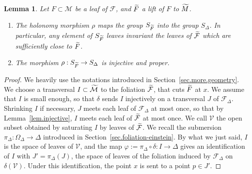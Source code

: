 \documentclass[11pt]{article}
\newtheorem{lemm}[theo]{Lemma}
\theoremstyle{definition}
\numberwithin{equation}{section}
\numberwithin{figure}{section}
\numberwithin{table}{section}
\newcommand{\calf}{\mathcal{F}}
\newcommand{\calm}{\mathcal{M}}
\newcommand{\tcalm}{\tilde{\mathcal{M}}}
\newcommand{\tm}{\tilde{{M}}}
\newcommand{\tcalf}{\tilde{{\mathcal{F}}}}
\newcommand{\tF}{\tilde{{F}}}
\let\oldtilde\tilde
\renewcommand*\tilde[1]{\mathchoice{\widetilde{#1}}{\widetilde{#1}}{\widetilde{#1}}{\oldtilde{#1}}}
\begin{document}
\begin{lemm}\label{lem.holonomy}
Let $F \subset \calm$ be a leaf of $\calf$, and $\tF$ a lift of $F$ to $\tm$.
\begin{enumerate}
\item \label{8.14.1}The holonomy morphism $\rho$ maps the group ${S}_{\tF}$ into the group $S_{\Delta}$. In particular, any element of $S_{\tF}$ leaves invariant the leaves of $\tcalf$ which are sufficiently close to $\tF$.
\item \label{8.14.2}The morphism $\rho : S_{\tF} \to S_{\Delta}$ is injective and proper.
\end{enumerate}
\end{lemm}

\begin{proof}
We heavily use the notations introduced in Section~\ref{sec.more.geometry}. We choose a transversal $I \subset \tcalm$ to the foliation $\tcalf$, that cuts $\tF$ at $x$. We assume that $I$ is small enough, so that $\delta$ sends $I$ injectively on a transversal $J$ of ${\mathcal F}_{\Delta}$. Shrinking $I$ if necessary, $J$ meets each leaf of ${\mathcal F}_{\Delta}$ at most once, so that by Lemma~\ref{lem.injective}, $I$ meets each leaf of $\tcalf$ at most once. We call $\mathcal{V}$ the open subset obtained by saturating $I$ by leaves of $\tcalf$. We recall the submersion $\pi_{\Delta}: \Omega_{\Delta} \to \Delta$ introduced in Section~\ref{sec.foliation-einstein}. By what we just said, $I$ is the space of leaves of $\mathcal{V}$, and the map $\varphi:=\pi_{\Delta} \circ \delta: I \to \Delta$ gives an identification of $I$ with $J'=\pi_{\Delta}(J)$, the space of leaves of the foliation induced by ${\mathcal F}_{\Delta}$ on $\delta({\mathcal V})$. Under this identification, the point $x$ is sent to a point $p \in J'$.


\end{proof}
\end{document}
